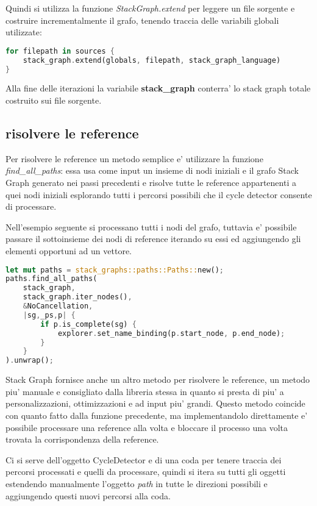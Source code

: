 Quindi si utilizza la funzione \emph{StackGraph.extend} per leggere un file sorgente e costruire incrementalmente il grafo, tenendo traccia delle variabili globali utilizzate:

\begin{lstlisting}[language=Rust]
for filepath in sources {
    stack_graph.extend(globals, filepath, stack_graph_language)
}
\end{lstlisting}

Alla fine delle iterazioni la variabile \textbf{stack\_graph} conterra' lo stack graph totale costruito sui file sorgente.

\subsection{risolvere le reference}

Per risolvere le reference un metodo semplice e' utilizzare la funzione \emph{find\_all\_paths}: essa usa come input un insieme di nodi iniziali e il grafo Stack Graph generato nei passi precedenti e risolve tutte le reference appartenenti a quei nodi iniziali esplorando tutti i percorsi possibili che il cycle detector consente di processare.

Nell'esempio seguente si processano tutti i nodi del grafo, tuttavia e' possibile passare il sottoinsieme dei nodi di reference iterando su essi ed aggiungendo gli elementi opportuni ad un vettore.

\begin{lstlisting}[language=Rust]
let mut paths = stack_graphs::paths::Paths::new();
paths.find_all_paths(
    stack_graph,
    stack_graph.iter_nodes(),
    &NoCancellation,
    |sg,_ps,p| {
        if p.is_complete(sg) {
            explorer.set_name_binding(p.start_node, p.end_node);
        }
    }
).unwrap();
\end{lstlisting}

Stack Graph fornisce anche un altro metodo per risolvere le reference, un metodo piu' manuale e consigliato dalla libreria stessa in quanto si presta di piu' a personalizzazioni, ottimizzazioni e ad input piu' grandi.
Questo metodo coincide con quanto fatto dalla funzione precedente, ma implementandolo direttamente e' possibile processare una reference alla volta e bloccare il processo una volta trovata la corrispondenza della reference.

Ci si serve dell'oggetto CycleDetector e di una coda per tenere traccia dei percorsi processati e quelli da processare, quindi si itera su tutti gli oggetti estendendo manualmente l'oggetto \emph{path} in tutte le direzioni possibili e aggiungendo questi nuovi percorsi alla coda.

